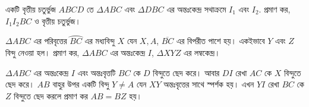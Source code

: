 \documentclass[a4paper,11pt]{article}
\begin{document}
\begin{Exercise}
	\begin{prob}
		একটি বৃত্তীয় চতুর্ভুজ $ABCD$ তে $\Delta ABC$ এবং $\Delta DBC$ এর অন্তঃকেন্দ্র সথাক্রমে $I_1$ এবং $I_2$. প্রমাণ কর, $I_1I_2BC$ ও বৃত্তীয় চতুর্ভুজ।  
	\end{prob}
	\begin{prob}[Lemma]
		$\Delta ABC$ এর পরিবৃত্তের $\wideparen{BC}$ এর মধ্যবিন্দু $X$ যেন $X,A$, $\overline{BC}$ এর বিপরীত পাশে হয়। একইভাবে $Y$ এবং $Z$ বিন্দু নেওয়া হল। প্রমাণ কর, $\Delta ABC$ এর অন্তঃকেন্দ্র $I$, $\Delta XYZ$ এর লম্বকেন্দ্র। 
		\begin{center}
		\end{center}
	\end{prob}
	\begin{prob}
		$\Delta ABC$ এর অন্তঃকেন্দ্র $I$ এবং অন্তঃবৃত্তটি $BC$ কে $D$ বিন্দুতে ছেদ করে। আবার $DI$ রেখা $AC$ কে $X$ বিন্দুতে ছেদ করে। $AB$ বাহুর উপর একটি বিন্দু $Y\neq A$ যেন $XY$ অন্তঃবৃত্তের সাথে স্পর্শক হয়। এখন $YI$ রেখা $BC$ কে $Z$ বিন্দুতে ছেদ করলে প্রমাণ কর $AB=BZ$ হয়। 
	\end{prob}
\end{Exercise}
\newpage
\end{document}
